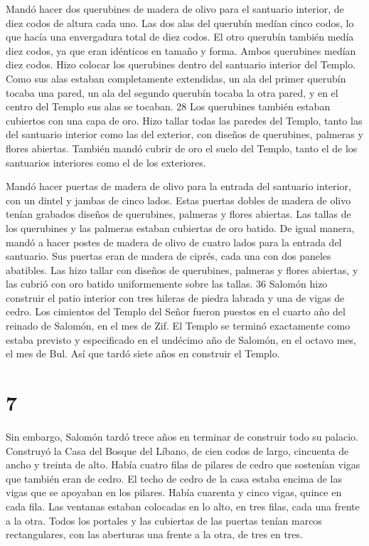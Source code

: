  Mandó hacer dos querubines de madera de olivo para el
santuario interior, de diez codos de altura cada uno.  Las
dos alas del querubín medían cinco codos, lo que hacía una envergadura
total de diez codos.  El otro querubín también medía diez
codos, ya que eran idénticos en tamaño y forma.  Ambos
querubines medían diez codos.  Hizo colocar los querubines
dentro del santuario interior del Templo. Como sus alas estaban
completamente extendidas, un ala del primer querubín tocaba una pared,
un ala del segundo querubín tocaba la otra pared, y en el centro del
Templo sus alas se tocaban. 28 Los querubines también estaban cubiertos
con una capa de oro.  Hizo tallar todas las paredes del
Templo, tanto las del santuario interior como las del exterior, con
diseños de querubines, palmeras y flores abiertas.  También
mandó cubrir de oro el suelo del Templo, tanto el de los santuarios
interiores como el de los exteriores.

 Mandó hacer puertas de madera de olivo para la entrada del
santuario interior, con un dintel y jambas de cinco lados. 
Estas puertas dobles de madera de olivo tenían grabados diseños de
querubines, palmeras y flores abiertas. Las tallas de los querubines y
las palmeras estaban cubiertas de oro batido.  De igual
manera, mandó a hacer postes de madera de olivo de cuatro lados para la
entrada del santuario.  Sus puertas eran de madera de
ciprés, cada una con dos paneles abatibles.  Las hizo
tallar con diseños de querubines, palmeras y flores abiertas, y las
cubrió con oro batido uniformemente sobre las tallas. 36 Salomón hizo
construir el patio interior con tres hileras de piedra labrada y una de
vigas de cedro.  Los cimientos del Templo del Señor fueron
puestos en el cuarto año del reinado de Salomón, en el mes de Zif.
 El Templo se terminó exactamente como estaba previsto y
especificado en el undécimo año de Salomón, en el octavo mes, el mes de
Bul. Así que tardó siete años en construir el Templo.

\hypertarget{section-6}{%
\section{7}\label{section-6}}

 Sin embargo, Salomón tardó trece años en terminar de
construir todo su palacio.  Construyó la Casa del Bosque del
Líbano, de cien codos de largo, cincuenta de ancho y treinta de alto.
Había cuatro filas de pilares de cedro que sostenían vigas que también
eran de cedro.  El techo de cedro de la casa estaba encima
de las vigas que se apoyaban en los pilares. Había cuarenta y cinco
vigas, quince en cada fila.  Las ventanas estaban colocadas
en lo alto, en tres filas, cada una frente a la otra.  Todos
los portales y las cubiertas de las puertas tenían marcos rectangulares,
con las aberturas una frente a la otra, de tres en tres.


